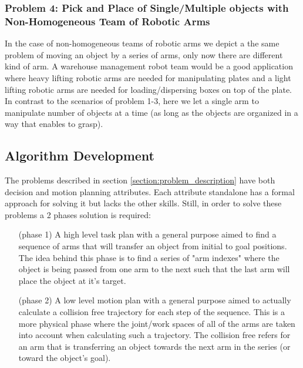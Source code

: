 \subsubsection*{Problem 4: Pick and Place of Single/Multiple objects with Non-Homogeneous Team of Robotic Arms }
In the case of non-homogeneous teams of robotic arms we depict a the same problem of moving an object by a series of arms, only now there are different kind of arm. A warehouse management robot team would be a good application where heavy lifting robotic arms are needed for manipulating plates and a light lifting robotic arms are needed for loading/dispersing boxes on top of the plate. In contrast to the scenarios of problem 1-3, here we let a single arm to manipulate number of objects at a time (as long as the objects are organized in a way that enables to grasp). 




\subsection{Algorithm Development}
\label{section:algorithm_development}
The problems described in section \ref{section:problem_description} have both decision and motion planning attributes. Each attribute standalone has a formal approach for solving it but lacks the other skills. Still, in order to solve these problems a 2 phases solution is required:

\begin{enumerate}
\item[(phase 1)] A high level task plan with a general purpose aimed to find a sequence of arms that will transfer an object from initial to goal positions. 
The idea behind this phase is to find a series of "arm indexes" where the object is being passed from one arm to the next such that the last arm will place the object at it's target.


\item[(phase 2)] A low level motion plan with a general purpose aimed to actually calculate a collision free trajectory for each step of the sequence. This is a more physical phase where the joint/work spaces of all of the arms are taken into account when calculating such a trajectory. The collision free refers for an arm that is transferring an object towards the next arm in the series (or toward the object's goal).

\end{enumerate}

